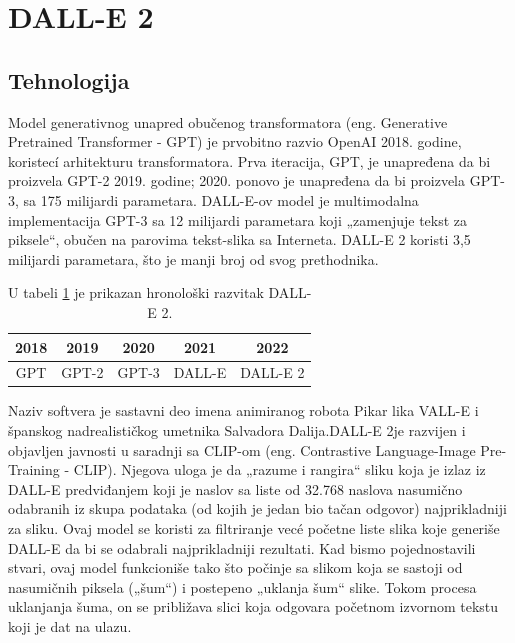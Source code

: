 \documentclass[a4paper]{article}
\begin{document}
\section{DALL-E 2}
\label{DALLE2}
\subsection{Tehnologija}
\label{subsec:tehnologija}
Model generativnog unapred obučenog transformatora (eng. Generative Pretrained Transformer - GPT) je prvobitno razvio OpenAI 2018. godine, koristecí arhitekturu transformatora. Prva iteracija, GPT, je unapređena da bi proizvela GPT-2 2019. godine; 2020. ponovo je unapređena da bi proizvela GPT-3, sa 175 milijardi parametara. DALL-E-ov model je multimodalna implementacija GPT-3 sa 12 milijardi parametara koji „zamenjuje tekst za piksele“, obučen na parovima tekst-slika sa Interneta. DALL-E 2 koristi 3,5 milijardi parametara, što je manji broj od svog prethodnika.
\begin{table}[h!]
\begin{center}
\caption{U tabeli \ref{tab:tabela1} je prikazan hronološki razvitak DALL-E 2.} 
\vspace{0.5cm}
\begin{tabular}{|c|c|c|c|c|} \hline
2018&2019&2020&2021&2022\\ \hline
GPT&GPT-2&GPT-3 &DALL-E&DALL-E 2\\ \hline
\end{tabular}
\label{tab:tabela1}
\end{center}
\end{table}
Naziv softvera je sastavni deo imena animiranog robota Pikar lika VALL-E i španskog
nadrealističkog umetnika Salvadora Dalija.DALL-E 2je razvijen i objavljen javnosti u saradnji sa CLIP-om (eng. Contrastive Language-Image Pre-Training - CLIP). Njegova uloga je da „razume i rangira“ sliku koja je izlaz iz DALL-E 
 predviđanjem koji je naslov sa liste od 32.768 naslova nasumično odabranih iz skupa podataka (od kojih je jedan bio tačan odgovor) najprikladniji za sliku. Ovaj model se koristi za filtriranje vecé početne liste slika koje generiše DALL-E da bi se odabrali najprikladniji rezultati. Kad bismo pojednostavili stvari, ovaj model funkcioniše tako što počinje sa slikom koja se sastoji od nasumičnih piksela („šum“) i postepeno „uklanja šum“ slike. Tokom procesa uklanjanja
šuma, on se približava slici koja odgovara početnom izvornom tekstu koji je dat na ulazu.

\newpage
\end{document}
